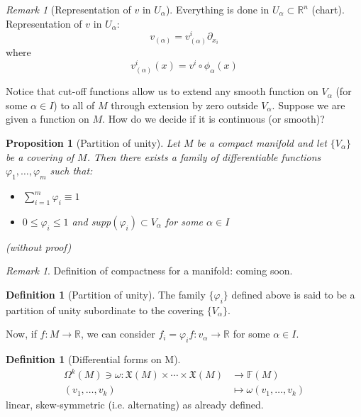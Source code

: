 \documentclass[a4paper,11pt,titlepage, article, oneside]{memoir}
\numberwithin{equation}{section}
\newtheorem{proposition}[theorem]{Proposition}
\theoremstyle{definition}
\newtheorem{definition}[theorem]{Definition}
\theoremstyle{remark}
\newtheorem{remark}[theorem]{Remark}
\newcommand{\rfield}{\mathbb{R}}
\begin{document}
\begin{remarkbox}\begin{remark}[Representation of $v$ in $U_{\alpha}$]
  Everything is done in $U_{\alpha} \subset \rfield^n$ (chart). Representation of $v$ in $U_{\alpha}$:
  $$v_{(\alpha)} = v_{(\alpha)}^i \partial_{x_i}$$
  where
  $$v_{(\alpha)}^i(x) = v^i \circ \phi_{\alpha}(x)$$
\end{remark}\end{remarkbox}

Notice that cut-off functions allow us to extend any smooth function on $V_{\alpha}$ (for some $\alpha \in I$) to all of $M$ through extension by zero outside $V_{\alpha}$.
Suppose we are given a function on $M$. How do we decide if it is continuous (or smooth)?
\begin{proposition}[Partition of unity]
Let $M$ be a compact manifold and let $\{V_{\alpha}\}$ be a covering of $M$. Then there exists a family of differentiable functions $\varphi_1, \ldots, \varphi_m$ such that:
\begin{itemize}
  \item $\sum\limits_{i=1}^m \varphi_i \equiv 1$
  \item $0 \le \varphi_i \le 1$ and supp$(\varphi_i) \subset V_{\alpha}$ for some $\alpha \in I$
\end{itemize}
(without proof)
\end{proposition}

\begin{remarkbox}\begin{remark}
  Definition of compactness for a manifold: coming soon.
\end{remark}\end{remarkbox}

\begin{definition}[Partition of unity]
  The family $\{\varphi_i\}$ defined above is said to be a partition of unity subordinate to the covering $\{V_{\alpha}\}$.
\end{definition}

Now, if $f \colon M \rightarrow \rfield$, we can consider $f_i = \varphi_i f \colon v_{\alpha} \rightarrow \rfield$ for some $\alpha \in I$.

\begin{definition}[Differential forms on M]
  \begin{align}
    \Omega^k(M) \ni \omega \colon \mathfrak{X}(M) \times \cdots \times \mathfrak{X}(M) &\rightarrow \mathbb{F}(M) \\
    (v_1, \ldots, v_k) &\mapsto \omega(v_1, \ldots, v_k) \nonumber
  \end{align}
  linear, skew-symmetric (i.e. alternating) as already defined.
\end{definition}
\end{document}
